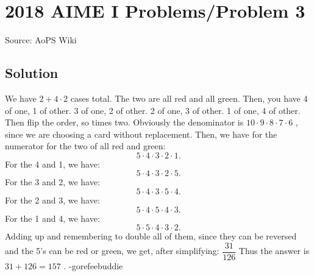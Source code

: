 \documentclass[12pt]{article}
\begin{document}
\section*{{2018 AIME I Problems/Problem 3}}
Source: AoPS Wiki

\subsection*{Solution}
We have $2+4\cdot 2$ cases total. The two are all red and all green. Then, you have 4 of one, 1 of other. 3 of one, 2 of other. 2 of one, 3 of other. 1 of one, 4 of other. Then flip the order, so times two. Obviously the denominator is $10\cdot 9\cdot 8\cdot 7\cdot 6$ , since we are choosing a card without replacement. Then, we have for the numerator for the two of all red and green: \[5\cdot 4\cdot 3\cdot 2\cdot 1.\] For the 4 and 1, we have: \[5\cdot 4\cdot 3\cdot 2\cdot 5.\] For the 3 and 2, we have: \[5\cdot 4\cdot 3\cdot 5\cdot 4.\] For the 2 and 3, we have: \[5\cdot 4\cdot 5\cdot 4\cdot 3.\] For the 1 and 4, we have: \[5\cdot 5\cdot 4\cdot 3\cdot 2.\] Adding up and remembering to double all of them, since they can be reversed and the 5's can be red or green, we get, after simplifying: $\dfrac{31}{126}$ Thus the answer is $31 + 126 = \boxed{157}$ .
-gorefeebuddie
\end{document}
